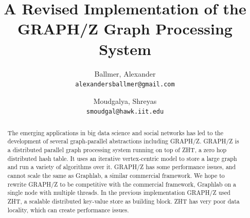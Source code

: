 \documentclass[10pt]{article}
\begin{document}
\nocite{Gz:5}
\nocite{Gz:6}
\nocite{Gz:7}
\nocite{Gz:8}
\nocite{Gz:9}
\nocite{Gz:10}
\nocite{Gz:11}
\nocite{Gz:12}
\title{A Revised Implementation of the GRAPH/Z Graph Processing System}

\author{
  Ballmer, Alexander\\
  \texttt{alexandersballmer@gmail.com}
  \and
  Moudgalya, Shreyas\\
  \texttt{smoudgal@hawk.iit.edu}
}

\maketitle

\begin{abstract}
  The emerging applications in big data science and social networks has led to the development of several graph-parallel abstractions including GRAPH/Z. GRAPH/Z is a distributed parallel graph processing system running on top of ZHT, a zero hop distributed hash table. It uses an iterative vertex-centric model to store a large graph and run a variety of algorithms over it. GRAPH/Z has some performance issues, and cannot scale the same as Graphlab, a similar commercial framework. We hope to rewrite GRAPH/Z to be competitive with the commercial framework, Graphlab on a single node with multiple threads.  In the previous implementation GRAPH/Z used ZHT, a scalable distributed key-value store as building block. ZHT has very poor data locality, which can create performance issues. 
\end{abstract}
\end{document}
